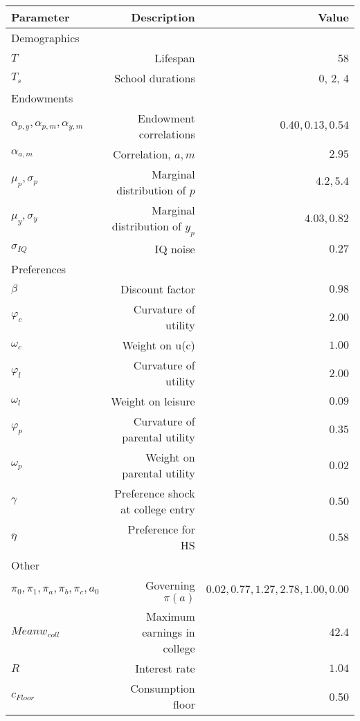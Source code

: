 \begin{tabular}{lrr}
\hline
Parameter & Description  & Value  \\
\hline
Demographics &   &   \\
$T$ & Lifespan  & 58  \\
$T_{s}$ & School durations  & 0, 2, 4  \\
Endowments &   &   \\
$\alpha_{p,y}, \alpha_{p,m}, \alpha_{y,m}$ & Endowment correlations  & $0.40, 0.13, 0.54$  \\
$\alpha_{a,m}$ & Correlation, $a,m$  & $2.95$  \\
$\mu_{p}, \sigma_{p}$ & Marginal distribution of $p$  & $4.2, 5.4$  \\
$\mu_{y}, \sigma_{y}$ & Marginal distribution of $y_{p}$  & $4.03, 0.82$  \\
$\sigma_{IQ}$ & IQ noise  & $0.27$  \\
Preferences &   &   \\
$\beta$ & Discount factor  & $0.98$  \\
$\varphi_{c}$ & Curvature of utility  & $2.00$  \\
$\omega_{c}$ & Weight on u(c)  & $1.00$  \\
$\varphi_{l}$ & Curvature of utility  & $2.00$  \\
$\omega_{l}$ & Weight on leisure  & $0.09$  \\
$\varphi_{p}$ & Curvature of parental utility  & $0.35$  \\
$\omega_{p}$ & Weight on parental utility  & $0.02$  \\
$\gamma$ & Preference shock at college entry  & $0.50$  \\
$\bar{\eta}$ & Preference for HS  & $0.58$  \\
Other &   &   \\
$\pi_{0}, \pi_{1}, \pi_{a}, \pi_{b}, \pi_{c}, a_{0}$ & Governing $\pi(a)$  & $0.02, 0.77, 1.27, 2.78, 1.00, 0.00$  \\
$Mean w_{coll}$ & Maximum earnings in college  & $42.4$  \\
$R$ & Interest rate  & $1.04$  \\
$c_{Floor}$ & Consumption floor  & 0.50  \\
\hline
\end{tabular}%
